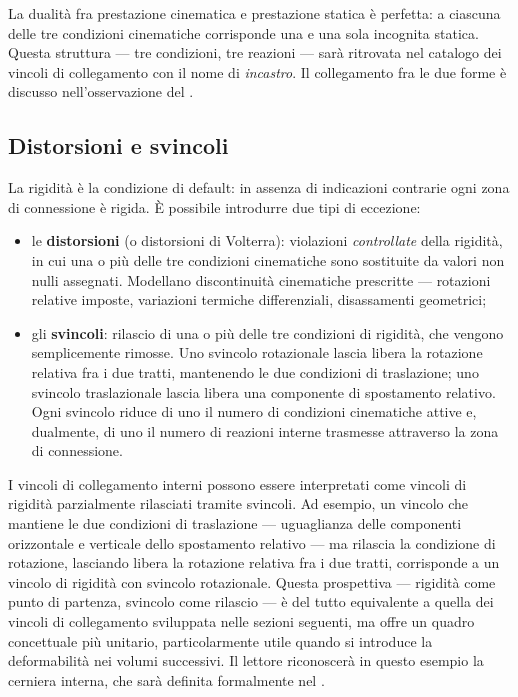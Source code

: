 \begin{oss}
	La dualità fra prestazione cinematica e prestazione
	statica è perfetta: a ciascuna delle tre condizioni
	cinematiche corrisponde una e una sola incognita
	statica. Questa struttura --- tre condizioni, tre
	reazioni --- sarà ritrovata nel catalogo dei vincoli
	di collegamento con il nome di \emph{incastro}.
	Il collegamento fra le due forme è discusso
	nell'osservazione del .
\end{oss}

\subsection{Distorsioni e svincoli}

La rigidità è la condizione di default: in assenza di
indicazioni contrarie ogni zona di connessione è rigida.
È possibile introdurre due tipi di eccezione:

\begin{itemize}[nosep]
	\item le \textbf{distorsioni} (o distorsioni di
	Volterra): violazioni \emph{controllate} della
	rigidità, in cui una o più delle tre condizioni
	cinematiche sono sostituite da valori non nulli
	assegnati. Modellano discontinuità cinematiche
	prescritte --- rotazioni relative imposte, variazioni
	termiche differenziali, disassamenti geometrici;
	\item gli \textbf{svincoli}: rilascio di una o più
	delle tre condizioni di rigidità, che vengono
	semplicemente rimosse. Uno svincolo rotazionale
	lascia libera la rotazione relativa fra i due tratti,
	mantenendo le due condizioni di traslazione; uno
	svincolo traslazionale lascia libera una componente
	di spostamento relativo. Ogni svincolo riduce di uno
	il numero di condizioni cinematiche attive e,
	dualmente, di uno il numero di reazioni interne
	trasmesse  attraverso la zona di connessione.
\end{itemize}

\begin{oss}
	I vincoli di collegamento interni possono essere
	interpretati come vincoli di rigidità parzialmente
	rilasciati tramite svincoli. Ad esempio, un vincolo
	che mantiene le due condizioni di traslazione ---
	uguaglianza delle componenti orizzontale e verticale
	dello spostamento relativo --- ma rilascia la
	condizione di rotazione, lasciando libera la rotazione
	relativa fra i due tratti, corrisponde a un vincolo
	di rigidità con svincolo rotazionale. Questa
	prospettiva --- rigidità come punto di partenza,
	svincolo come rilascio --- è del tutto equivalente
	a quella dei vincoli di collegamento sviluppata nelle
	sezioni seguenti, ma offre un quadro concettuale
	più unitario, particolarmente utile quando si
	introduce la deformabilità nei volumi successivi.
	Il lettore riconoscerà in questo esempio la cerniera
	interna, che sarà definita formalmente nel
	.
\end{oss}


